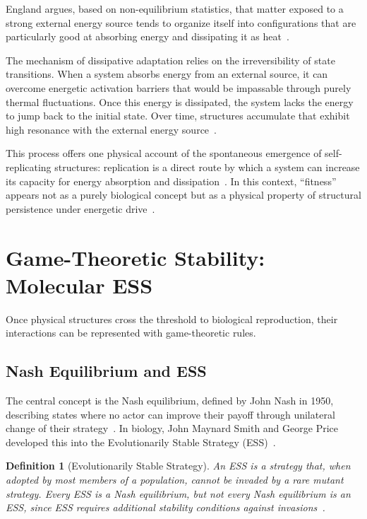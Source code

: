 \documentclass[12pt,a4paper]{article}
\newtheorem{definition}{Definition}
\theoremstyle{remark}
\begin{document}
England argues, based on non-equilibrium statistics, that matter exposed to a strong external energy source tends to organize itself into configurations that are particularly good at absorbing energy and dissipating it as heat~\citep{England2013}.

The mechanism of dissipative adaptation relies on the irreversibility of state transitions. When a system absorbs energy from an external source, it can overcome energetic activation barriers that would be impassable through purely thermal fluctuations. Once this energy is dissipated, the system lacks the energy to jump back to the initial state. Over time, structures accumulate that exhibit high resonance with the external energy source~\citep{EnglandNano}.

This process offers one physical account of the spontaneous emergence of self-replicating structures: replication is a direct route by which a system can increase its capacity for energy absorption and dissipation~\citep{EnglandNano}. In this context, ``fitness'' appears not as a purely biological concept but as a physical property of structural persistence under energetic drive~\citep{England2013}.

\section{Game-Theoretic Stability: Molecular ESS}
\label{sec:molecular}

Once physical structures cross the threshold to biological reproduction, their interactions can be represented with game-theoretic rules.

\subsection{Nash Equilibrium and ESS}

The central concept is the Nash equilibrium, defined by John Nash in 1950, describing states where no actor can improve their payoff through unilateral change of their strategy~\citep{NashPNAS,NashSFI}. In biology, John Maynard Smith and George Price developed this into the Evolutionarily Stable Strategy (ESS)~\citep{MaynardSmithPrice1973,MaynardSmith1982}.

\begin{definition}[Evolutionarily Stable Strategy]
An ESS is a strategy that, when adopted by most members of a population, cannot be invaded by a rare mutant strategy. Every ESS is a Nash equilibrium, but not every Nash equilibrium is an ESS, since ESS requires additional stability conditions against invasions~\citep{MaynardSmith1982}.
\end{definition}
\end{document}
